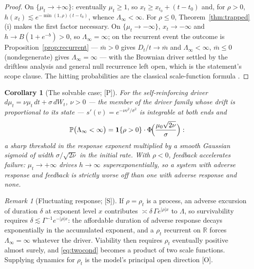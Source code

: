 \documentclass[11pt]{article}
\newtheorem{corollary}[theorem]{Corollary}
\theoremstyle{definition}
\theoremstyle{remark}
\newtheorem{remark}[theorem]{Remark}
\newcommand{\PP}{\mathbb{P}}
\newcommand{\R}{\mathbb{R}}
\newcommand{\one}{\mathbf{1}}
\begin{document}

\begin{proof}
On $\{\mu_t\to+\infty\}$: eventually $\mu_t\ge1$, so
$x_t\ge x_{t_0}+(t-t_0)$ and, for $\rho>0$,
$h(x_t)\lesssim e^{-\min(1,\rho)(t-t_0)}$, whence
$\Lambda_\infty<\infty$. For $\rho\le0$,
Theorem~\ref{thm:trapped}(i) makes the first factor necessary. On
$\{\mu_t\to-\infty\}$, $x_t\to-\infty$ and
$h\to B(1+e^{-b})>0$, so $\Lambda_\infty=\infty$; on the recurrent
event the outcome is Proposition~\ref{prop:recurrent} ---
$\bar m>0$ gives $D_t/t\to\bar m$ and $\Lambda_\infty<\infty$,
$\bar m\le0$ (nondegenerate) gives $\Lambda_\infty=\infty$ --- with
the Brownian driver settled by the driftless analysis and general
null recurrence left open, which is the statement's scope clause.
The hitting probabilities are the classical scale-function formula
\cite{KT81,RY99}.
\end{proof}

\begin{corollary}[The solvable case; {[P]}]\label{cor:solvable}
For the self-reinforcing driver $d\mu_t=\nu\mu_t\,dt+\sigma\,dW_t$,
$\nu>0$ --- the member of the driver family whose drift is
proportional to its state ---
$s'(v)=e^{-\nu v^2/\sigma^2}$ is integrable at both ends and
\begin{equation}\label{eq:sigmoid}
\PP\bigl(\Lambda_\infty<\infty\bigr)
=\one\{\rho>0\}\cdot\Phi\!\Bigl(\frac{\mu_0\sqrt{2\nu}}{\sigma}\Bigr):
\end{equation}
a sharp threshold in the response exponent multiplied by a smooth
Gaussian sigmoid of width $\sigma/\sqrt{2\nu}$ in the initial rate.
With $\rho<0$, feedback accelerates failure:
$\mu_t\to+\infty$ drives $h\to\infty$ superexponentially, so a system
with adverse response and feedback is strictly worse off than one with
adverse response and none.
\end{corollary}

\begin{remark}[Fluctuating response; {[S]}]\label{rem:fluct}
If $\rho=\rho_t$ is a process, an adverse excursion of duration
$\delta$ at exponent level $x$ contributes
$\asymp\delta\,\Gamma e^{|\rho|x}$ to $\Lambda$, so survivability
requires $\delta\lesssim\Gamma^{-1}e^{-|\rho|x}$: the affordable
duration of adverse response decays exponentially in the accumulated
exponent, and a $\rho_t$ recurrent on $\R$ forces
$\Lambda_\infty=\infty$ whatever the driver. Viability then requires
$\rho_t$ eventually positive almost surely, and \eqref{eq:twocond}
becomes a product of two scale functions. Supplying dynamics for
$\rho_t$ is the model's principal open direction [O].
\end{remark}
\end{document}
